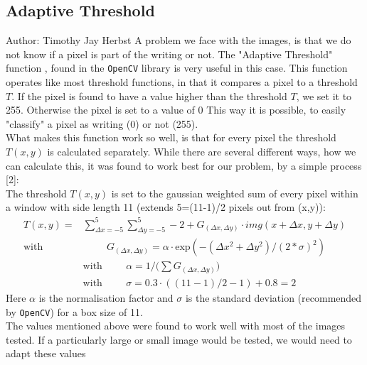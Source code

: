 \documentclass[12pt]{article}
\begin{document}
	\subsection{Adaptive Threshold} %
	\small{Author: Timothy Jay Herbst} \newline \newline
	A problem we face with the images, is that we do not know if a pixel is part of the writing or not.
	The "Adaptive Threshold" function \cite{adaThresh}, found in the \texttt{OpenCV} library is very useful in this case. %
	This function operates like most threshold functions, in that it compares a pixel to a threshold $T$.
	If the pixel is found to have a value higher than the threshold $T$, we set it to 255.
	Otherwise the pixel is set to a value of 0 \cite{cvAdaThresh}
	This way it is possible, to easily "classify" a pixel as writing (0) or not (255).\\
	What makes this function work so well, is that for every pixel the threshold $T(x,y)$ is calculated separately.
	While there are several different ways, how we can calculate this, it was found to work best for our problem, by a simple process [2]:\\
	The threshold $T(x,y)$ is set to the gaussian weighted sum of every pixel within a window with side length 11 (extends 5=(11-1)/2 pixels out from (x,y)):
	\begin{align}
	T(x,y)=&\sum_{\Delta x=-5}^{5}\sum_{\Delta y=-5}^{5} -2 + G_{(\Delta x,\Delta y)} \cdot img(x+\Delta x,y+\Delta y)\\
	\mathrm{with}& \hspace{1cm} G_{(\Delta x,\Delta y)} = \alpha \cdot \mathrm{exp}(-(\Delta x ^2 +\Delta y^2)/(2*\sigma)^2)\\ %
	&\mathrm{with} \hspace{1cm}\alpha = 1/\Big(\sum G_{(\Delta x,\Delta y)}\Big)\\
	&\mathrm{with} \hspace{1cm}\sigma = 0.3 \cdot ((11-1)/2-1) + 0.8 = 2
	\end{align}
	Here $\alpha$ is the normalisation factor and $\sigma$ is the  standard deviation (recommended by \texttt{OpenCV}) for a box size of 11.\\
	The values mentioned above were found to work well with most of the images tested.
	If a particularly large or small image would be tested, we would need to adapt these values
	
\end{document}
